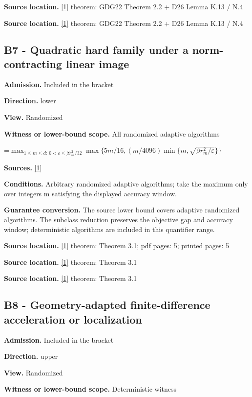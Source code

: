 \documentclass[10pt,a4paper]{article}
\newcommand{\AtlasMath}[1]{\par\begingroup\centering\setbox0=\hbox{$\displaystyle #1$}\ifdim\wd0>1.4\linewidth\typeout{ATLAS WIDE FORMULA: \the\wd0}\fi\ifdim\wd0>\linewidth\resizebox{\linewidth}{!}{\box0}\else\box0\fi\par\endgroup}
\begin{document}
\textbf{Source location.} \href{https://arxiv.org/html/2610.00345v1}{[1]} theorem: GDG22 Theorem 2.2 + D26 Lemma K.13 / N.4

\textbf{Source location.} \href{https://arxiv.org/html/2610.00345v1}{[1]} theorem: GDG22 Theorem 2.2 + D26 Lemma K.13 / N.4

\subsection{B7 - Quadratic hard family under a norm-contracting linear image}
\textbf{Admission.} Included in the bracket

\textbf{Direction.} lower

\textbf{View.} Randomized

\textbf{Witness or lower-bound scope.} All randomized adaptive algorithms

\AtlasMath{\max_{1\le m\le d:\ 0<\varepsilon\le\beta r_m^2/32}\max\{5m/16,(m/4096)\min\{m,\sqrt{\beta r_m^2/\varepsilon}\}\}}
\textbf{Sources.} \href{https://arxiv.org/html/2610.00345v1}{[1]}

\textbf{Conditions.} Arbitrary randomized adaptive algorithms; take the maximum only over integers m satisfying the displayed accuracy window.

\textbf{Guarantee conversion.} The source lower bound covers adaptive randomized algorithms. The subclass reduction preserves the objective gap and accuracy window; deterministic algorithms are included in this quantifier range.

\textbf{Source location.} \href{https://arxiv.org/html/2610.00345v1}{[1]} theorem: Theorem 3.1; pdf pages: 5; printed pages: 5

\textbf{Source location.} \href{https://arxiv.org/html/2610.00345v1}{[1]} theorem: Theorem 3.1

\textbf{Source location.} \href{https://arxiv.org/html/2610.00345v1}{[1]} theorem: Theorem 3.1

\subsection{B8 - Geometry-adapted finite-difference acceleration or localization}
\textbf{Admission.} Included in the bracket

\textbf{Direction.} upper

\textbf{View.} Randomized

\textbf{Witness or lower-bound scope.} Deterministic witness
\end{document}
